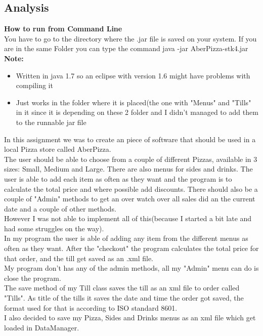 \documentclass[11pt,a4paper]{article}
\begin{document}
\begin{flushleft}
\section{Analysis}

\textbf{How to run from Command Line}\\
You have to go to the directory where the .jar file is saved on your system.
If you are in the same Folder you can type the command java -jar AberPizza-stk4.jar\\

\textbf{Note:}
\begin{itemize}
\item Written in java 1.7 so an eclipse with version 1.6 might have problems with compiling it
\item Just works in the folder where it is placed(the one with "Menus" and "Tills" in it since it is depending on these 2 folder and I didn't managed to add them to the runnable jar file
\end{itemize}
\vspace{11pt}
In this assignment we was to create an piece of software that should be used in a local Pizza store called AberPizza.\\
The user should be able to choose from a couple of different Pizzas, available in 3 sizes:
Small, Medium and Large. There are also menus for sides and drinks. The user is able to add each item as often as they want and the program is to calculate the total price and where possible add 
discounts. There should also be a couple of "Admin" methods to get an over watch over all sales did an the current date and a couple of other methods. \\
However I was not able to implement all of this(because I started a bit late and had some struggles on the way). \\
In my program the user is able of adding any item from the different menus as often as they want. 
After the "checkout" the program calculates the total price for that order, and the till get saved as an .xml file.\\
My program don't has any of the admin methods, all my "Admin" menu can do is close the program.\\
The save method of my Till class saves the till as an xml file to order called "Tills".
As title of the tills it saves the date and time the order got saved, the format used for that is according to ISO standard 8601.\\
I also decided to save my Pizza, Sides and Drinks menus as an xml file which get loaded in DataManager. \\

\end{flushleft}
\end{document}
